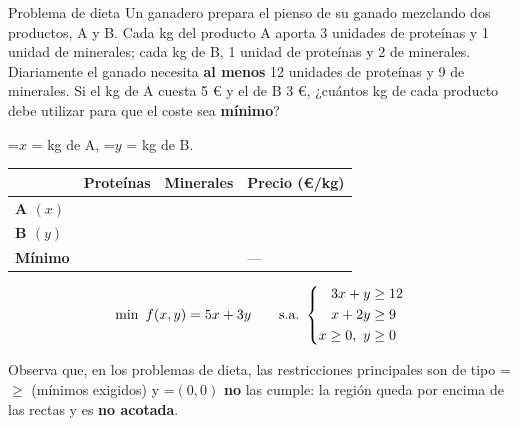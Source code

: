 \documentclass[11pt,a4paper]{article}
\newcommand{\fmm}[1]{\setbox0=\hbox{$#1$}\ifdim\wd0>\linewidth\fmdisp{#1}\else\mbox{\box0}\fi}
\newcommand{\fmdisp}[1]{\[\setbox2=\hbox{$\displaystyle #1$}\ifdim\wd2>\linewidth\resizebox{\linewidth}{!}{\box2}\else\box2\fi\]}
\begin{document}
\begin{fmex}{Problema de dieta}
Un ganadero prepara el pienso de su ganado mezclando dos productos, A y B. Cada kg del producto A aporta 3 unidades de proteínas y 1 unidad de minerales; cada kg de B, 1 unidad de proteínas y 2 de minerales. Diariamente el ganado necesita \textbf{al menos} 12 unidades de proteínas y 9 de minerales. Si el kg de A cuesta 5 € y el de B 3 €, ¿cuántos kg de cada producto debe utilizar para que el coste sea \textbf{mínimo}?

\fmm{x} = kg de A, \fmm{y} = kg de B.

\begin{center}\renewcommand{\arraystretch}{1.5}\small\begin{tabularx}{\linewidth}{>{\raggedright\arraybackslash}p{3.2cm}>{\raggedright\arraybackslash}X>{\raggedright\arraybackslash}X>{\raggedright\arraybackslash}X}\toprule
\textbf{} & \textbf{Proteínas} & \textbf{Minerales} & \textbf{Precio (€/kg)}\\\midrule
\textbf{A $(x)$} & 3 & 1 & 5\\[3pt]
\textbf{B $(y)$} & 1 & 2 & 3\\[3pt]
\textbf{Mínimo} & 12 & 9 & —\\[3pt]
\bottomrule\end{tabularx}\end{center}

\fmdisp{\min\ f(x,y)=5x+3y\qquad\text{s.a.}\ \left\{\begin{aligned}3x+y&\geq12\\ x+2y&\geq9\\ x\geq0,\ y&\geq0\end{aligned}\right.}

Observa que, en los problemas de dieta, las restricciones principales son de tipo \fmm{\geq} (mínimos exigidos) y \fmm{(0,0)} \textbf{no} las cumple: la región queda por encima de las rectas y es \textbf{no acotada}.


\end{fmex}
\end{document}
